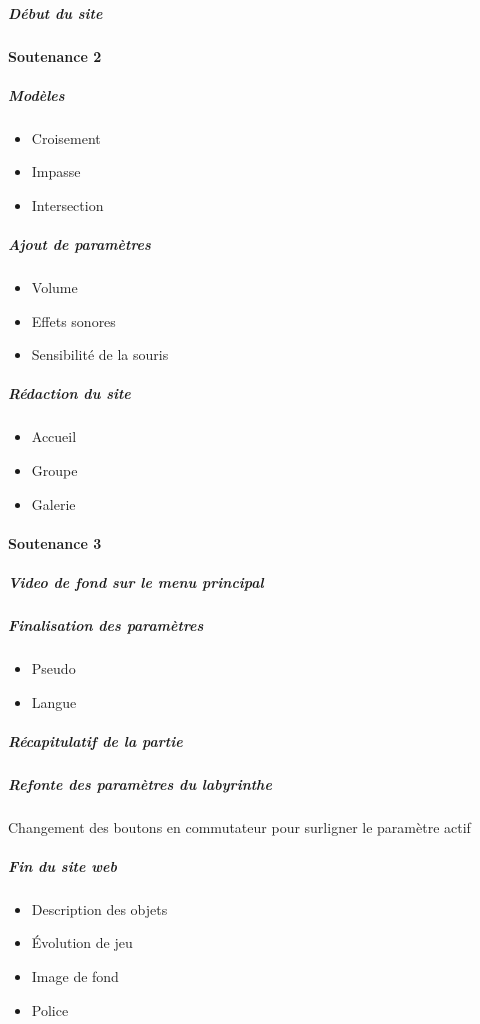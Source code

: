 \documentclass{article}
\begin{document}
\subparagraph{Début du site}

\paragraph{Soutenance 2}

\subparagraph{Modèles}

\begin{itemize}
	\item Croisement
	\item Impasse
	\item Intersection
\end{itemize}

\subparagraph{Ajout de paramètres}

\begin{itemize}
	\item Volume
	\item Effets sonores
	\item Sensibilité de la souris
\end{itemize}

\subparagraph{Rédaction du site}

\begin{itemize}
	\item Accueil
	\item Groupe
	\item Galerie
\end{itemize}

\paragraph{Soutenance 3}

\subparagraph{Video de fond sur le menu principal}

\subparagraph{Finalisation des paramètres}

\begin{itemize}
	\item Pseudo
	\item Langue
\end{itemize}

\subparagraph{Récapitulatif de la partie}

\subparagraph{Refonte des paramètres du labyrinthe}

Changement des boutons en commutateur pour surligner le paramètre actif

\subparagraph{Fin du site web}

\begin{itemize}
	\item Description des objets
	\item Évolution de jeu
	\item Image de fond
	\item Police
\end{itemize}
\end{document}
